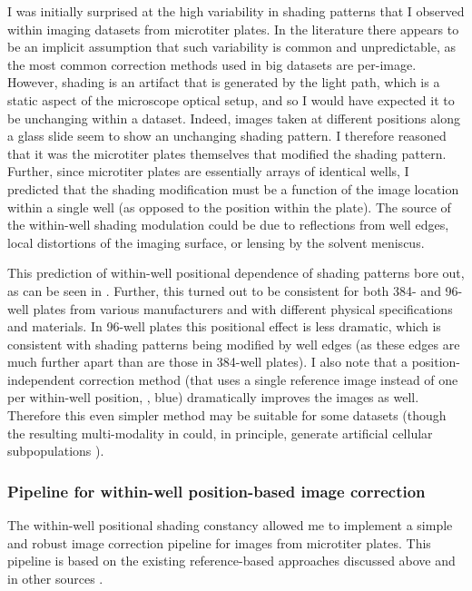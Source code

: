 I was initially surprised at the high variability in shading patterns that I
observed within imaging datasets from microtiter plates.
In the literature there
appears to be an implicit assumption that such
variability is common and unpredictable,
as the most common correction methods used in big datasets are
per-image. However, shading is an artifact that is
generated by the light path, which is a static aspect of the microscope
optical setup, and so I would have expected it to be
unchanging within a dataset. Indeed, images taken at different positions along a
glass slide seem to show an unchanging shading pattern.
I therefore reasoned that it was the microtiter plates
themselves that modified the
shading pattern. Further, since microtiter plates are essentially
arrays of identical wells, I
predicted that the shading modification must be a function of the
image location
within a single well (as opposed to the position within the plate).
The source of the within-well shading modulation could be due to
reflections from well edges, local distortions
of the imaging surface, or lensing by
the solvent meniscus.


This prediction of within-well positional dependence of
shading patterns bore out, as can be seen in
. Further, this turned out
to be consistent for both 384- and 96-well plates from various
manufacturers and with different physical specifications
and materials. In 96-well plates
this positional effect is less dramatic, which is consistent with
shading patterns being modified by well edges (as these edges
are much further apart than are those in 384-well plates). I also note that
a position-independent correction method (that uses a single reference
image instead of one per within-well position,
, blue) dramatically improves
the images as well. Therefore this even simpler method may be suitable
for some datasets (though the resulting multi-modality in
 could, in principle, generate
artificial cellular subpopulations ).




\subsubsection{Pipeline for within-well position-based image correction}
\label{correction:pipeline}

The within-well positional shading constancy allowed
me to implement a simple and robust image correction pipeline
for images from microtiter plates. This pipeline is based on the
existing reference-based approaches discussed above and in other
sources \cite{Bray2012,Bray2013}.




